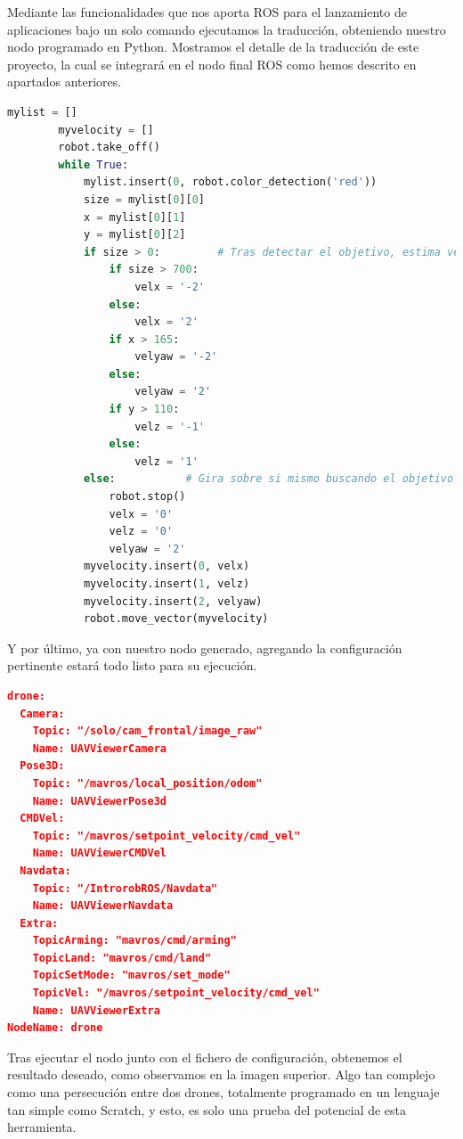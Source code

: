 Mediante las funcionalidades que nos aporta ROS para el lanzamiento de aplicaciones bajo un solo comando ejecutamos la traducción, obteniendo nuestro nodo programado en Python. Mostramos el detalle de la traducción de este proyecto, la cual se integrará en el nodo final ROS como hemos descrito en apartados anteriores.

\begin{lstlisting}[language=python,firstnumber=1]
 		mylist = [] 
 		myvelocity = []
        robot.take_off()
        while True:
            mylist.insert(0, robot.color_detection('red'))
            size = mylist[0][0]
            x = mylist[0][1]
            y = mylist[0][2]
            if size > 0: 		 # Tras detectar el objetivo, estima velocidades
                if size > 700:
                    velx = '-2'
                else:
                    velx = '2'
                if x > 165:
                    velyaw = '-2'
                else:
                    velyaw = '2'               
                if y > 110:
                    velz = '-1'
                else:
                    velz = '1'               
            else:			# Gira sobre si mismo buscando el objetivo
                robot.stop()
                velx = '0'
                velz = '0'
                velyaw = '2'            
            myvelocity.insert(0, velx)
            myvelocity.insert(1, velz)
            myvelocity.insert(2, velyaw)
            robot.move_vector(myvelocity)
\end{lstlisting}

Y por último, ya con nuestro nodo generado, agregando la configuración pertinente estará todo listo para su ejecución.

\begin{lstlisting}[language=json,firstnumber=1]
drone:
  Camera:
    Topic: "/solo/cam_frontal/image_raw"
    Name: UAVViewerCamera    
  Pose3D:
    Topic: "/mavros/local_position/odom"
    Name: UAVViewerPose3d
  CMDVel:
    Topic: "/mavros/setpoint_velocity/cmd_vel"
    Name: UAVViewerCMDVel    
  Navdata:
    Topic: "/IntrorobROS/Navdata"
    Name: UAVViewerNavdata 
  Extra:
    TopicArming: "mavros/cmd/arming"
    TopicLand: "mavros/cmd/land"
    TopicSetMode: "mavros/set_mode"
    TopicVel: "/mavros/setpoint_velocity/cmd_vel"
    Name: UAVViewerExtra
NodeName: drone
\end{lstlisting}
Tras ejecutar el nodo junto con el fichero de configuración, obtenemos el resultado deseado, como observamos en la imagen superior. Algo tan complejo como una persecución entre dos drones, totalmente programado en un lenguaje tan simple como Scratch, y esto, es solo una prueba del potencial de esta herramienta.\\


